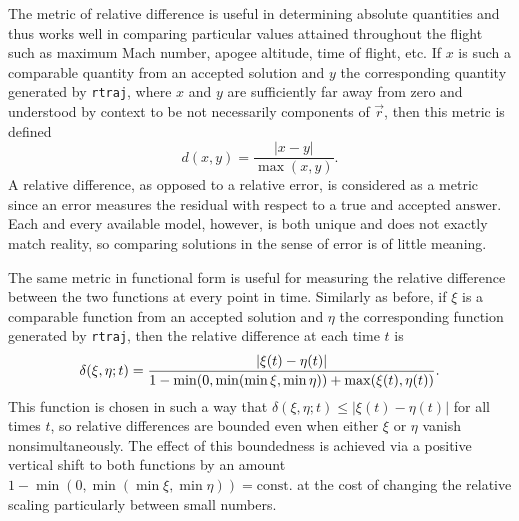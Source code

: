 \documentclass[11pt]{thesis}
\numberwithin{equation}{section}
\begin{document}
The metric of relative difference is useful in determining absolute quantities and thus works well in comparing particular values attained throughout the flight such as maximum Mach number, apogee altitude, time of flight, etc. If $x$ is such a comparable quantity from an accepted solution and $y$ the corresponding quantity generated by \texttt{rtraj}, where $x$ and $y$ are sufficiently far away from zero and understood by context to be not necessarily components of $\vec{r}$, then this metric is defined
\begin{equation}
d(x, y) = \frac{|x - y|}{\max(x,y)}.
\end{equation}
A relative difference, as opposed to a relative error, is considered as a metric since an error measures the residual with respect to a true and accepted answer. Each and every available model, however, is both unique and does not exactly match reality, so comparing solutions in the sense of error is of little meaning.

The same metric in functional form is useful for measuring the relative difference between the two functions at every point in time. Similarly as before, if $\xi$ is a comparable function from an accepted solution and $\eta$ the corresponding function generated by \texttt{rtraj}, then the relative difference at each time $t$ is
\begin{equation}
\delta(\xi, \eta; t) = \frac{\abs{\xi(t) - \eta(t)}}{1 - \min(0, \min(\min\xi, \min\eta)) + \max(\xi(t), \eta(t))}.
\end{equation}
This function is chosen in such a way that $\delta(\xi, \eta; t) \leq |\xi(t) - \eta(t)|$ for all times $t$, so relative differences are bounded even when either $\xi$ or $\eta$ vanish nonsimultaneously. The effect of this boundedness is achieved via a positive vertical shift to both functions by an amount $1 - \min(0, \min(\min \xi, \min\eta)) = \mathrm{const.}$ at the cost of changing the relative scaling particularly between small numbers.
\end{document}
